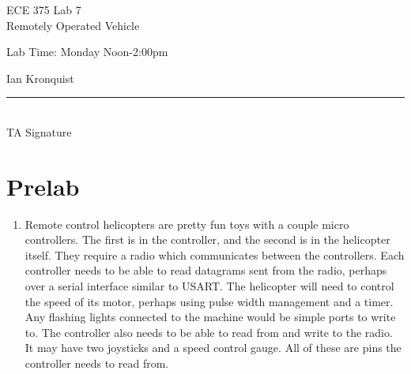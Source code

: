 \documentclass[12pt,letterpaper]{article}
\begin{document}
\begin{titlepage}
    \vspace*{4cm}
    \begin{flushright}
    {\huge
        ECE 375 Lab 7\\[1cm]
    }
    {\large
        Remotely Operated Vehicle
    }
    \end{flushright}
    \begin{flushleft}
    Lab Time: Monday Noon-2:00pm
    \end{flushleft}
    \begin{flushright}
    Ian Kronquist
    \vfill
    \rule{5in}{.5mm}\\
    TA Signature
    \end{flushright}

\end{titlepage}

\section{Prelab}
\begin{enumerate}
    \item Remote control helicopters are pretty fun toys with a couple micro controllers. The first is in the controller, and the second is in the helicopter itself. They require a radio which communicates between the controllers. Each controller needs to be able to read datagrams sent from the radio, perhaps over a serial interface similar to USART. The helicopter will need to control the speed of its motor, perhaps using pulse width management and a timer. Any flashing lights connected to the machine would be simple ports to write to. The controller also needs to be able to read from and write to the radio. It may have two joysticks and a speed control gauge. All of these are pins the controller needs to read from.
\end{enumerate} 
\end{document}
